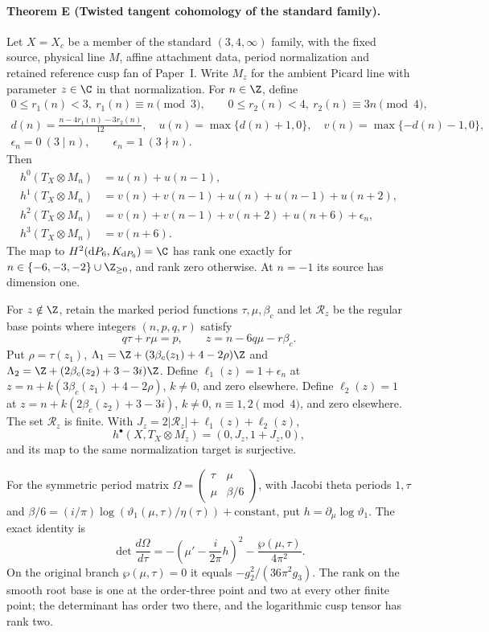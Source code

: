 \paragraph{Theorem E (Twisted tangent cohomology of the standard family).}
\label{series:II:E}
Let $X=X_c$ be a member of the standard $(3,4,\infty)$ family,
with the fixed source, physical line $M$, affine attachment data,
period normalization and retained reference cusp fan of Paper~I.
Write $M_z$ for the ambient Picard line with parameter $z\in\C$
in that normalization. For $n\in\Z$, define
\[
 \begin{gathered}
 0\le r_1(n)<3,\ r_1(n)\equiv n\pmod3,\qquad
 0\le r_2(n)<4,\ r_2(n)\equiv3n\pmod4,\\
 d(n)=\frac{n-4r_1(n)-3r_2(n)}{12},\quad
 u(n)=\max\{d(n)+1,0\},\quad v(n)=\max\{-d(n)-1,0\},\\
 \epsilon_n=0\ (3\mid n),\qquad \epsilon_n=1\ (3\nmid n).
 \end{gathered}
\]
Then
\[
\begin{aligned}
 h^0(T_X\otimes M_n)&=u(n)+u(n-1),\\
 h^1(T_X\otimes M_n)&=v(n)+v(n-1)+u(n)+u(n-1)+u(n+2),\\
 h^2(T_X\otimes M_n)&=v(n)+v(n-1)+v(n+2)+u(n+6)+\epsilon_n,\\
 h^3(T_X\otimes M_n)&=v(n+6).
\end{aligned}
\]
The map to $H^2(\mathrm dP_6,K_{\mathrm dP_6})=\C$ has rank one
exactly for $n\in\{-6,-3,-2\}\cup\Z_{\ge0}$, and rank zero
otherwise. At $n=-1$ its source has dimension one.

For $z\notin\Z$, retain the marked period functions
$\tau,\mu,\beta_c$ and let $\mathcal R_z$ be the regular base
points where integers $(n,p,q,r)$ satisfy
\[
 q\tau+r\mu=p,\qquad z=n-6q\mu-r\beta_c.
\]
Put $\rho=\tau(z_1)$,
$\Lambda_1=\Z+(3\beta_c(z_1)+4-2\rho)\Z$ and
$\Lambda_2=\Z+(2\beta_c(z_2)+3-3i)\Z$.
Define $\ell_1(z)=1+\epsilon_n$ at
$z=n+k(3\beta_c(z_1)+4-2\rho)$, $k\ne0$, and zero elsewhere.
Define $\ell_2(z)=1$ at
$z=n+k(2\beta_c(z_2)+3-3i)$, $k\ne0$,
$n\equiv1,2\pmod4$, and zero elsewhere. The set $\mathcal R_z$
is finite. With $J_z=2|\mathcal R_z|+\ell_1(z)+\ell_2(z)$,
\[
 h^\bullet(X,T_X\otimes M_z)=(0,J_z,1+J_z,0),
\]
and its map to the same normalization target is surjective.

For the symmetric period matrix
$\Omega=\left(\begin{smallmatrix}\tau&\mu\\\mu&\beta/6\end{smallmatrix}\right)$,
with Jacobi theta periods $1,\tau$ and
$\beta/6=(i/\pi)\log(\vartheta_1(\mu,\tau)/\eta(\tau))+\mathrm{constant}$,
put $h=\partial_\mu\log\vartheta_1$. The exact identity is
\[
 \det\frac{d\Omega}{d\tau}
 =-\left(\mu'-\frac{i}{2\pi}h\right)^2
   -\frac{\wp(\mu,\tau)}{4\pi^2}.
\]
On the original branch $\wp(\mu,\tau)=0$ it equals
$-g_2^2/(36\pi^2g_3)$. The rank on the smooth root base is one
at the order-three point and two at every other finite point;
the determinant has order two there, and the logarithmic cusp
tensor has rank two.

